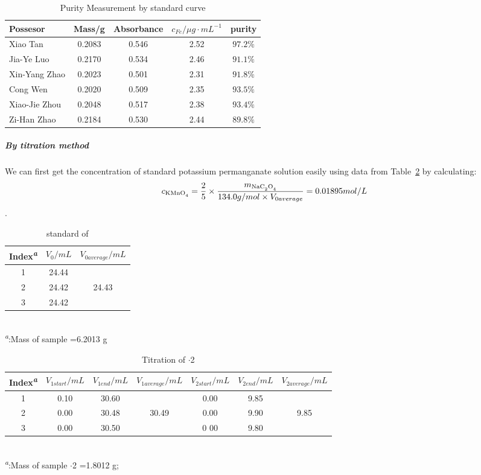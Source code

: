 \documentclass[journal=jacsat,manuscript=article]{achemso}
\begin{document}
\begin{table}[H]
    \caption{Purity Measurement by standard curve}
    \label{tab.Pcurve}
    \begin{tabular}{lcccc}
    \toprule
    Possesor      &Mass/g & Absorbance &$c_{Fe}/\mu g\cdot mL^{-1}$& purity   \\
    \midrule
    Xiao Tan      &0.2083 & 0.546      & 2.52   &$97.2\%$  \\
    Jia-Ye Luo    &0.2170 & 0.534      & 2.46   &$91.1\%$  \\
    Xin-Yang Zhao &0.2023 & 0.501      & 2.31   &$91.8\%$  \\
    Cong Wen      &0.2020 & 0.509      & 2.35   &$93.5\%$  \\
    Xiao-Jie Zhou &0.2048 & 0.517      & 2.38   &$93.4\%$  \\
    Zi-Han Zhao   &0.2184 & 0.530      & 2.44   &$89.8\%$  \\
    \bottomrule
    \end{tabular}
\end{table}

\subparagraph{By titration method}
We can first get the concentration of standard potassium permanganate solution easily using data from Table~\ref{tab.CalMn} by calculating: \[c_{\ce{KMnO4}}=\frac{2}{5}\times\frac{m_{\ce{NaC2O4}}}{134.0 g/mol\times V_{0average}}=0.01895mol/L\].

\begin{table}[H]
    \caption{standard of }
    \label{tab.CalMn}
    \begin{tabular}{ccc}
    \toprule
    Index\textsuperscript{\emph{a}}&$V_0/mL$&$V_{0average}/mL$\\
    \midrule
    1    & 24.44 &\\
    2    & 24.42 & 24.43\\
    3    & 24.42 &\\
    \bottomrule
    \end{tabular}\\
    \textsuperscript{\emph{a}}:Mass of sample =6.2013 g
\end{table}

\begin{table}[H]
    \caption{Titration of $\cdot$2}
    \label{tab.Tit}
    \begin{tabular}{ccccccc}
    \toprule
    Index\textsuperscript{\emph{a}}&$V_{1start}/mL$&$V_{1end}/mL$&$V_{1average}/mL$&$V_{2start}/mL$& $V_{2end}/mL$&$V_{2average}/mL$\\
    \midrule
    1    & 0.10 & 30.60 &       & 0.00 & 9.85 &     \\
    2    & 0.00 & 30.48 & 30.49 & 0.00 & 9.90 & 9.85\\
    3    & 0.00 & 30.50 &       & 0 00 & 9.80 &     \\
    \bottomrule
    \end{tabular}\\
    \textsuperscript{\emph{a}}:Mass of sample $\cdot$2 =1.8012 g;
\end{table}
\end{document}

